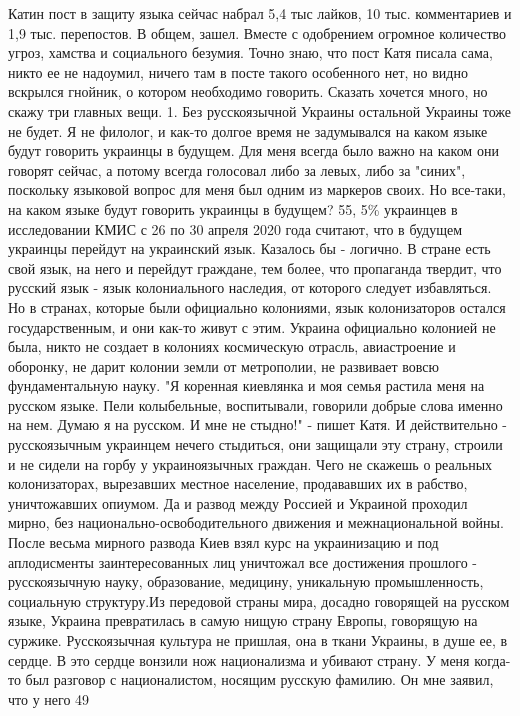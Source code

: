 Катин пост в защиту языка сейчас набрал 5,4 тыс лайков, 10 тыс. комментариев и 1,9 тыс. перепостов. В общем, зашел. Вместе с одобрением огромное количество угроз, хамства и социального безумия. Точно знаю, что пост Катя писала сама, никто ее не надоумил, ничего там в посте такого особенного нет, но видно вскрылся гнойник, о котором необходимо говорить. Сказать хочется много, но скажу три главных вещи. 
1. Без русскоязычной Украины остальной Украины тоже не будет. 
Я не филолог, и как-то долгое время не задумывался на каком языке будут говорить украинцы в будущем. Для меня всегда было важно на каком они говорят сейчас, а потому всегда голосовал либо за левых, либо за "синих", поскольку языковой вопрос для меня был одним из маркеров своих. Но все-таки, на каком языке будут говорить украинцы в будущем? 55, 5\% украинцев в исследовании КМИС с 26 по 30 апреля 2020 года считают, что в будущем украинцы перейдут на украинский язык. 
Казалось бы - логично. В стране есть свой язык, на него и перейдут граждане, тем более, что пропаганда твердит, что русский язык - язык колониального наследия, от которого следует избавляться. 
Но в странах, которые были официально колониями, язык колонизаторов остался государственным, и они как-то живут с этим. Украина официально колонией не была, никто не создает в колониях космическую отрасль, авиастроение и оборонку, не дарит колонии земли от метрополии, не развивает вовсю фундаментальную науку. 
"Я коренная киевлянка и моя семья растила меня на русском языке. Пели колыбельные, воспитывали, говорили добрые слова именно на нем. Думаю я на русском. И мне не стыдно!" - пишет Катя. И действительно - русскоязычным украинцем нечего стыдиться, они защищали эту страну, строили и не сидели на горбу у украиноязычных граждан. Чего не скажешь о реальных колонизаторах, вырезавших местное население, продававших их в рабство, уничтожавших опиумом. 
Да и развод между Россией и Украиной проходил мирно, без национально-освободительного движения и межнациональной войны. 
После весьма мирного развода Киев взял курс на украинизацию и под аплодисменты заинтересованных лиц уничтожал все достижения прошлого - русскоязычную науку, образование, медицину, уникальную промышленность, социальную структуру.Из передовой страны мира, досадно говорящей на русском языке, Украина превратилась в самую нищую страну Европы, говорящую на суржике.
Русскоязычная культура не пришлая, она в ткани Украины, в душе ее, в сердце. В это сердце вонзили нож национализма и убивают страну. У меня когда-то был разговор с националистом, носящим русскую фамилию. Он мне заявил, что у него 49%
